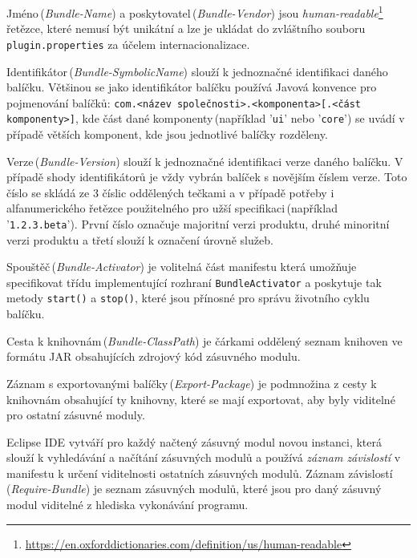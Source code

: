       Jméno\,(\emph{Bundle-Name}) a poskytovatel\,(\emph{Bundle-Vendor}) jsou \emph{human-readable}\footnote{\url{https://en.oxforddictionaries.com/definition/us/human-readable}} řetězce, které nemusí být unikátní a lze je ukládat do zvláštního souboru \texttt{plugin.properties} za účelem internacionalizace.

      Identifikátor\,(\emph{Bundle-SymbolicName}) slouží k jednoznačné identifikaci daného balíčku. Většinou se jako identifikátor balíčku používá Javová konvence pro pojmenování balíčků: \texttt{com.<název společnosti>.<komponenta>[.<část komponenty>]}, kde část dané komponenty\,(například '\texttt{ui}' nebo '\texttt{core}') se uvádí v případě větších komponent, kde jsou jednotlivé balíčky rozděleny.
      
      Verze\,(\emph{Bundle-Version}) slouží k jednoznačné identifikaci verze daného balíčku. V případě shody identifikátorů je vždy vybrán balíček s novějším číslem verze. Toto číslo se skládá ze 3 číslic oddělených tečkami a v případě potřeby i alfanumerického řetězce použitelného pro užší specifikaci\,(například '\texttt{1.2.3.beta}'). První číslo označuje majoritní verzi produktu, druhé minoritní verzi produktu a třetí slouží k označení úrovně služeb.

      Spouštěč\,(\emph{Bundle-Activator}) je volitelná část manifestu která umožňuje specifikovat třídu implementující rozhraní \texttt{BundleActivator} a poskytuje tak metody \texttt{start()} a \texttt{stop()}, které jsou přínosné pro správu životního cyklu balíčku.

      Cesta k knihovnám\,(\emph{Bundle-ClassPath}) je čárkami oddělený seznam knihoven ve formátu JAR obsahujících zdrojový kód zásuvného modulu.

      Záznam s exportovanými balíčky\,(\emph{Export-Package}) je podmnožina z cesty k knihovnám obsahující ty knihovny, které se mají exportovat, aby byly viditelné pro ostatní zásuvné moduly.

      Eclipse IDE vytváří pro každý načtený zásuvný modul novou instanci, která slouží k vyhledávání a načítání zásuvných modulů a používá \emph{záznam závislostí} v manifestu k určení viditelnosti ostatních zásuvných modulů. Záznam závislostí\,(\emph{Require-Bundle}) je seznam zásuvných modulů, které jsou pro daný zásuvný modul viditelné z hlediska vykonávání programu.

